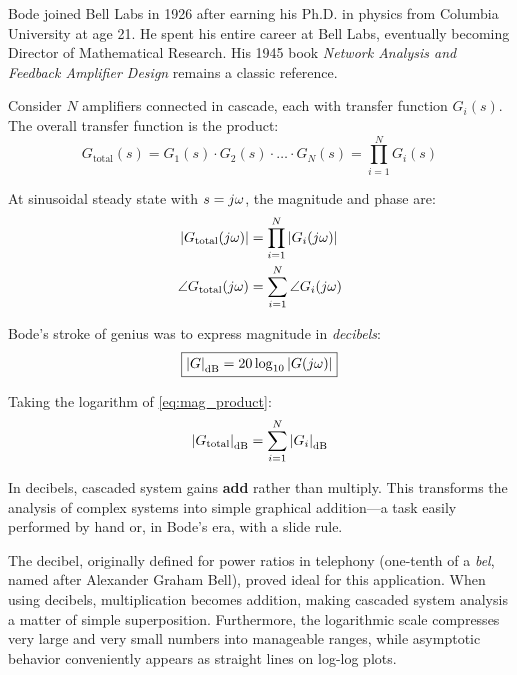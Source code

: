 \begin{historicalbox}
Bode joined Bell Labs in 1926 after earning his Ph.D. in physics from Columbia University at age 21. He spent his entire career at Bell Labs, eventually becoming Director of Mathematical Research. His 1945 book \textit{Network Analysis and Feedback Amplifier Design} remains a classic reference.
\end{historicalbox}

Consider $N$ amplifiers connected in cascade, each with transfer function $G_i(s)$. The overall transfer function is the product:
\begin{equation}
G_{\text{total}}(s) = G_1(s) \cdot G_2(s) \cdot \ldots \cdot G_N(s) = \prod_{i=1}^{N} G_i(s)
\label{eq:cascade_product}
\end{equation}

At sinusoidal steady state with $s = j\omega$, the magnitude and phase are:
\begin{align}
\left|G_{\text{total}}(j\omega)\right| &= \prod_{i=1}^{N} \left|G_i(j\omega)\right| \label{eq:mag_product}\\
\angle G_{\text{total}}(j\omega) &= \sum_{i=1}^{N} \angle G_i(j\omega) \label{eq:phase_sum}
\end{align}

Bode's stroke of genius was to express magnitude in \textit{decibels}:
\begin{equation}
\boxed{\left|G\right|_{\text{dB}} = 20 \log_{10} \left|G(j\omega)\right|}
\label{eq:decibel_def}
\end{equation}

Taking the logarithm of \cref{eq:mag_product}:
\begin{equation}
\left|G_{\text{total}}\right|_{\text{dB}} = \sum_{i=1}^{N} \left|G_i\right|_{\text{dB}}
\label{eq:db_sum}
\end{equation}

\begin{keypoint}
In decibels, cascaded system gains \textbf{add} rather than multiply. This transforms the analysis of complex systems into simple graphical addition---a task easily performed by hand or, in Bode's era, with a slide rule.
\end{keypoint}

The decibel, originally defined for power ratios in telephony (one-tenth of a \textit{bel}, named after Alexander Graham Bell), proved ideal for this application. When using decibels, multiplication becomes addition, making cascaded system analysis a matter of simple superposition. Furthermore, the logarithmic scale compresses very large and very small numbers into manageable ranges, while asymptotic behavior conveniently appears as straight lines on log-log plots.

